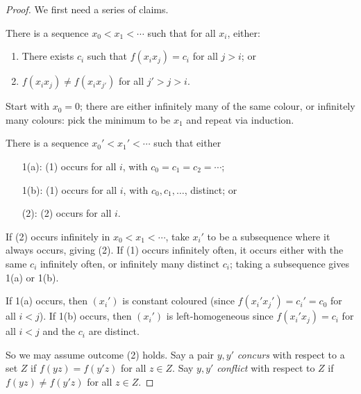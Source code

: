 \documentclass[main.tex]{subfiles}
\begin{document}
\begin{proof}%
  We first need a series of claims.
  \begin{claim}
    There is a sequence $x_0 < x_1 < \cdots$ such that for all $x_i$, either:
    \begin{enumerate}[label=(\arabic*)]
      \item There exists $c_i$ such that $f(x_ix_j) = c_i$ for all $j > i$; or
      \item $f(x_ix_j)\neq f(x_ix_{j'})$ for all $j' > j > i$.
    \end{enumerate}
  \end{claim}
  \begin{subproof}
    Start with $x_0 = 0$; there are either infinitely many of the same colour,
    or infinitely many colours: pick the minimum to be $x_1$ and repeat via induction.
  \end{subproof}

  \begin{claim}
    There is a sequence $x_0' < x_1' < \cdots$ such that either
    \begin{enumerate}[label=\arabic*]
      \item[1(a):] (1) occurs for all $i$, with $c_0 = c_1 = c_2 = \cdots$;
      \item[1(b):] (1) occurs for all $i$, with $c_0, c_1, \ldots$, distinct; or
      \item[(2):] (2) occurs for all $i$.
    \end{enumerate}
  \end{claim}
  \begin{subproof}%
    If (2) occurs infinitely in $x_0 < x_1 < \cdots$, take $x_i'$ to be a
    subsequence where it always occurs, giving (2).
    If (1) occurs infinitely often, it occurs either with the same $c_i$
    infinitely often, or infinitely many distinct $c_i$; taking a subsequence
    gives 1(a) or 1(b).
  \end{subproof}

  If 1(a) occurs, then $(x_i')$ is constant coloured (since
  $f(x_i'x_j') = c_i' = c_0$ for all $i < j$).
  If 1(b) occurs, then $(x_i')$ is left-homogeneous since $f(x_i'x_j) = c_i$
  for all $i < j$ and the $c_i$ are distinct.

  So we may assume outcome (2) holds.
  Say a pair $y,y'$ \textit{concurs} with respect to a set $Z$ if
  $f(yz) = f(y'z)$ for all $z\in Z$.
  Say $y,y'$ \textit{conflict} with respect to $Z$ if $f(yz)\neq f(y'z)$
  for all $z\in Z$.


\end{proof}
\end{document}
